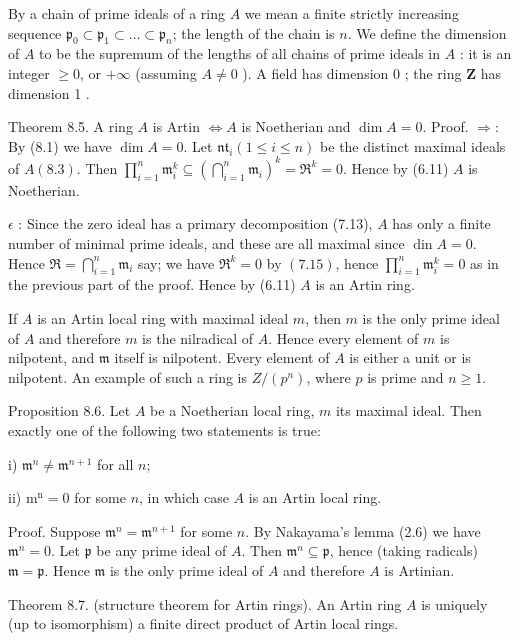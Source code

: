 \documentclass{standalone}
\theoremstyle{definition}
\theoremstyle{remark}
\begin{document}
By a chain of prime ideals of a ring $A$ we mean a finite strictly increasing sequence $\mathfrak{p}_{0} \subset \mathfrak{p}_{1} \subset \ldots \subset \mathfrak{p}_{n}$; the length of the chain is $n$. We define the dimension of $A$ to be the supremum of the lengths of all chains of prime ideals in $A$ : it is an integer $\geqslant 0$, or $+\infty$ (assuming $A \neq 0$ ). A field has dimension 0 ; the ring $\mathbf{Z}$ has dimension 1 .

Theorem 8.5. A ring $A$ is Artin $\Leftrightarrow A$ is Noetherian and $\operatorname{dim} A=0$. Proof. $\Rightarrow:$ By (8.1) we have $\operatorname{dim} A=0$. Let $\mathfrak{n t}_{i}(1 \leqslant i \leqslant n)$ be the distinct maximal ideals of $A(8.3)$. Then $\prod_{i=1}^{n} \mathfrak{m}_{i}^{k} \subseteq\left(\bigcap_{i=1}^{n} \mathfrak{m}_{i}\right)^{k}=\mathfrak{R}^{k}=0$. Hence by (6.11) $A$ is Noetherian.

$\epsilon$ : Since the zero ideal has a primary decomposition (7.13), $A$ has only a finite number of minimal prime ideals, and these are all maximal since $\operatorname{din} A=0$. Hence $\mathfrak{R}=\bigcap_{i=1}^{n} \mathfrak{m}_{i}$ say; we have $\mathfrak{R}^{k}=0$ by $(7.15)$, hence $\prod_{i=1}^{n} \mathfrak{m}_{i}^{k}=0$ as in the previous part of the proof. Hence by (6.11) $A$ is an Artin ring.

If $A$ is an Artin local ring with maximal ideal $m$, then $m$ is the only prime ideal of $A$ and therefore $m$ is the nilradical of $A$. Hence every element of $m$ is nilpotent, and $\mathfrak{m}$ itself is nilpotent. Every element of $A$ is either a unit or is nilpotent. An example of such a ring is $Z /\left(p^{n}\right)$, where $p$ is prime and $n \geqslant 1$.

Proposition 8.6. Let $A$ be a Noetherian local ring, $m$ its maximal ideal. Then exactly one of the following two statements is true:

i) $\mathfrak{m}^{n} \neq \mathfrak{m}^{n+1}$ for all $n$;

ii) $\mathrm{m}^{\mathrm{n}}=0$ for some $n$, in which case $A$ is an Artin local ring.

Proof. Suppose $\mathfrak{m}^{n}=\mathfrak{m}^{n+1}$ for some $n$. By Nakayama's lemma (2.6) we have $\mathfrak{m}^{n}=0$. Let $\mathfrak{p}$ be any prime ideal of $A$. Then $\mathfrak{m}^{n} \subseteq \mathfrak{p}$, hence (taking radicals) $\mathfrak{m}=\mathfrak{p}$. Hence $\mathfrak{m}$ is the only prime ideal of $A$ and therefore $A$ is Artinian.

Theorem 8.7. (structure theorem for Artin rings). An Artin ring $A$ is uniquely (up to isomorphism) a finite direct product of Artin local rings.
\end{document}
